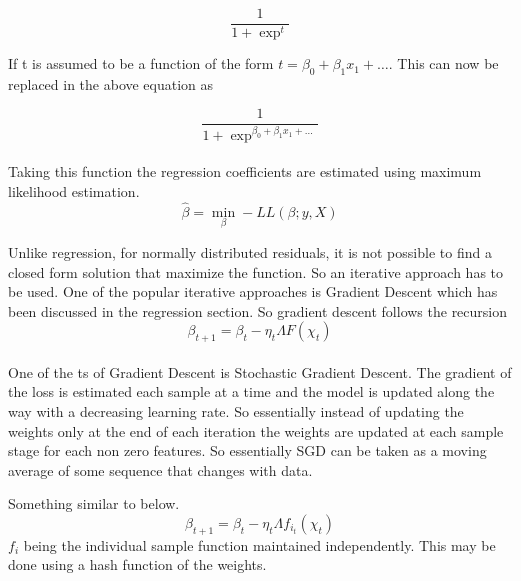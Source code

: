 \documentclass{book}
\begin{document}
\begin{equation}
	\frac{1}{1 + \exp^t}
\end{equation}

If t is assumed to be a function of the form $t = \beta_0 + \beta_1 x_1 + \dots$. This can now be replaced in the above equation as

\begin{equation}
	\frac{1}{1 + \exp^{\beta_0 + \beta_1 x_1 + \dots}}
\end{equation}
\label{par:}

\paragraph{}%
Taking this function the regression coefficients are estimated using maximum likelihood estimation.
\begin{equation}
	\hat{\beta} = \min_{\beta} - LL(\beta; y, X)
\end{equation}

Unlike regression, for normally distributed residuals, it is not possible to find a closed form solution that maximize the function. So an iterative approach has to be used. One of the popular iterative approaches is Gradient Descent which has been discussed in the regression section. So gradient descent follows the recursion
\begin{equation}
	\beta_{t + 1} = \beta_t - \eta_t \Lambda F(\chi_t)
\end{equation}

\label{par:}

\paragraph{}%
One of the ts of Gradient Descent is Stochastic Gradient Descent. The gradient of the loss is estimated each sample at a time and the model is updated along the way with a decreasing learning rate. So essentially instead of updating the weights only at the end of each iteration the weights are updated at each sample stage for each non zero features. So essentially SGD can be taken as a moving average of some sequence that changes with data.

Something similar to below.
\begin{equation}
	\beta_{t + 1} = \beta_t - \eta_t \Lambda f_{i_t}(\chi_t)
\end{equation}
$f_i$ being the individual sample function maintained independently. This may be done using a hash function of the weights.
\label{par:}
\end{document}
